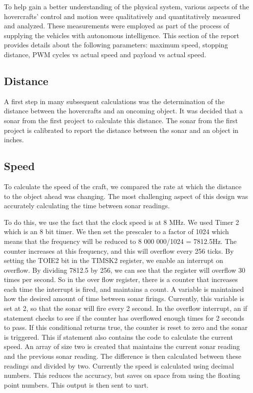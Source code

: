 To help gain a better understanding of the physical system, various aspects of the hovercrafts' control and motion were qualitatively and quantitatively measured and analyzed. These measurements were employed as part of the process of supplying the vehicles with autonomous intelligence. This section of the report provides details about the following parameters: maximum speed, stopping distance, PWM cycles vs actual speed and payload vs actual speed.

\subsection{Distance}
A first step in many subsequent calculations was the determination of the distance between the hovercrafts and an oncoming object. It was decided that a sonar from the first project to calculate this distance. The sonar from the first project is calibrated to report the distance between the sonar and an object in inches.

\subsection{Speed}
To calculate the speed of the craft, we compared the rate at which the distance to the object ahead was changing. The most challenging aspect of this design was accurately calculating the time between sonar readings.

To do this, we use the fact that the clock speed is at 8 MHz. We used Timer 2 which is an 8 bit timer. We then set the prescaler to a factor of 1024 which means that the frequency will be reduced to 8 000 000/1024 = 7812.5Hz. The counter increases at this frequency, and this will overflow every 256 ticks. By setting the TOIE2 bit in the TIMSK2 register, we enable an interrupt on overflow. By dividing 7812.5 by 256, we can see that the register will overflow 30 times per second. So in the over flow register, there is a counter that increases each time the interrupt is fired, and maintains a count. A variable is maintained how the desired amount of time between sonar firings. Currently, this variable is set at 2, so that the sonar will fire every 2 second. In the overflow interrupt, an if statement checks to see if the counter has overflowed enough times for 2 seconds to pass. If this conditional returns true, the counter is reset to zero and the sonar is triggered. This if statement also contains the code to calculate the current speed. An array of size two is created that maintains the current sonar reading and the previous sonar reading. The difference is then calculated between these readings and divided by two. Currently the speed is calculated using decimal numbers. This reduces the accuracy, but saves on space from using the floating point numbers. This output is then sent to uart.

